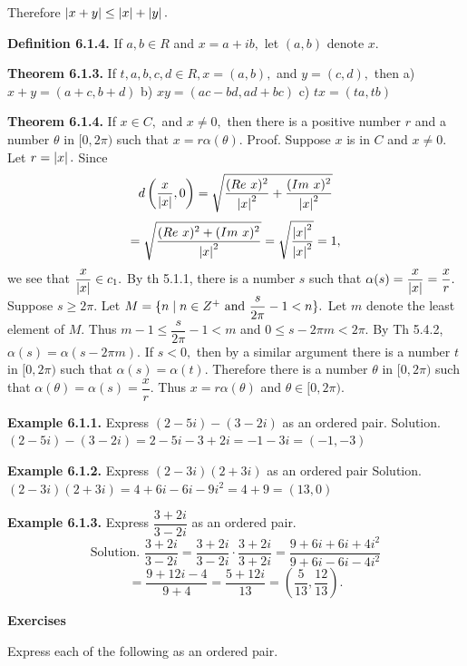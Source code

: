 Therefore $\left|x + y\right| \leq \left|x\right| + \left|y\right|.$\nl

\textbf{Definition 6.1.4.}  If $a,b\in R$ and $x = a + ib,$ let $(a, b)$ denote $x$.\nl

\textbf{Theorem 6.1.3.}  If $t,a,b,c,d\in R, x = (a, b),$ and $y = (c, d),$ then\nl
a) $x + y = (a+c, b+d)$\nl
b) $xy = (ac - bd, ad + bc)$\nl
c) $tx = (ta, tb)$\nl

\textbf{Theorem 6.1.4.}  If $x\in C,$ and $x \neq 0,$ then there is a positive number $r$ and a number $\theta$ in $[0, 2\pi)$ such that $x = r\alpha (\theta).$\nl
Proof.  Suppose $x$ is in $C$ and $x\neq 0.$  Let $r = \left|x\right|.$  Since\nl
\[
d\left(\dfrac{x}{\left|x\right|}, 0 \right) = \sqrt{\dfrac{(Re~x)^{2}}{\left|x\right|^{2}} + \dfrac{(Im~x)^{2}}{\left|x\right|^{2}}}
\]
\[
=\sqrt{\dfrac{(Re~x)^{2} + (Im~x)^{2}}{\left|x\right|^{2}}} = \sqrt{\dfrac{\left|x\right|^{2}}{\left|x\right|^{2}}} = 1,
\]\nl
we see that $\dfrac{x}{\left|x\right|}\in c_{1}.$  By th 5.1.1, there is a number $s$ such that $\alpha(s) = \dfrac{x}{\left|x\right|} = \dfrac{x}{r}.$\nl
Suppose $s \geq 2\pi.$  Let $M = \{n \mid n\in Z^{+} \text{~and~} \dfrac{s}{2\pi} - 1 < n \}.$  Let $m$ denote the least element of $M$.  Thus $m - 1 \leq \dfrac{s}{2\pi} - 1 < m$ and $0 \leq s - 2\pi m < 2\pi.$
By Th 5.4.2, $\alpha(s) = \alpha (s - 2\pi m).$   If $s < 0,$ then by a similar argument there is a number $t$ in $[0, 2\pi)$ such that $\alpha(s) = \alpha(t).$  Therefore there is a number $\theta$ in $[0, 2\pi)$ such that $\alpha (\theta) = \alpha(s) = \dfrac{x}{r}.$  Thus $x = r\alpha(\theta)$ and $\theta \in [0, 2\pi).$

\newpage

\textbf{Example 6.1.1.}  Express $(2 - 5i) - (3 - 2i)$ as an ordered pair.\nl
Solution. $(2-5i) -(3-2i)= 2 - 5i - 3 + 2i = -1 - 3i =(-1,-3) $\nl

\textbf{Example 6.1.2.} Express $(2 - 3i)(2 + 3i)$ as an ordered pair\nl
 Solution. $(2 - 3i)(2 + 3i)=4 + 6i - 6i -9i^{2} = 4 + 9 =(13,0)$\nl



\textbf{Example 6.1.3.} Express $\dfrac{3 + 2i}{3 - 2i}$ as an ordered pair.\nl
\[
\text{Solution.~} \dfrac{3 + 2i}{3 - 2i} = \dfrac{3 + 2i}{3 - 2i}\cdot \dfrac{3 + 2i}{3 + 2i} = \dfrac{9 + 6i +6i + 4i^{2}}{9 + 6i -6i - 4i^{2}}
\]
\[
=\dfrac{9 + 12i - 4}{9 + 4} = \dfrac{5 + 12i}{13} = \left(\dfrac{5}{13}, \dfrac{12}{13}\right).
\]

\textbf{Exercises}\nl

Express each of the following as an ordered pair.


